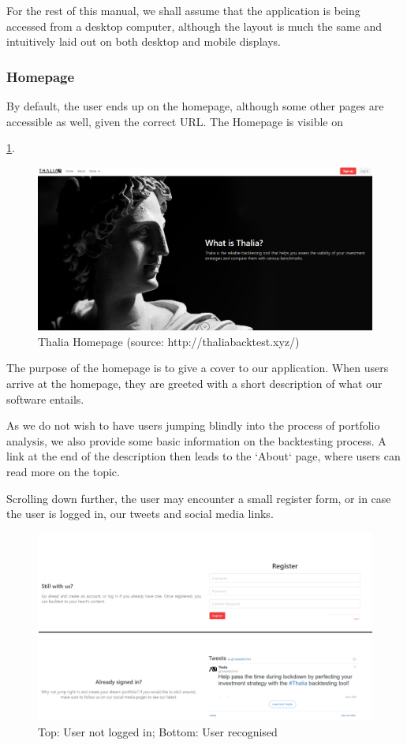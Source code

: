 \documentclass[main.tex]{subfiles}
\begin{document}
For the rest of this manual, we shall assume that the application is being accessed from a desktop computer, although the layout is much the same and intuitively laid out on both desktop and mobile displays. 

\subsubsection{Homepage}
By default, the user ends up on the homepage, although some other pages are accessible as well, given the correct URL. The Homepage is visible on 

\figurename{\ref{thalia_home}}.
\begin{figure}[H]
   \centering
   \includegraphics[width=\textwidth]{08Appendices/081User/081Pictures/homepage.png}
   \caption{Thalia Homepage (source: http://thaliabacktest.xyz/)}
   \label{thalia_home}
\end{figure}

The purpose of the homepage is to give a cover to our application. When users arrive at the homepage, they are greeted with a short description of what our software entails.

As we do not wish to have users jumping blindly into the process of portfolio analysis, we also provide some basic information on the backtesting process. A link at the end of the description then leads to the `About` page, where users can read more on the topic.

Scrolling down further, the user may encounter a small register form, or in case the user is logged in, our tweets and social media links.

\begin{figure}[H]
   \centering
   \includegraphics[width=\textwidth]{08Appendices/081User/081Pictures/homepage_bottom.png}
   \caption{Top: User not logged in; Bottom: User recognised}
   \label{thalia_home_bottom}
\end{figure}
\end{document}
